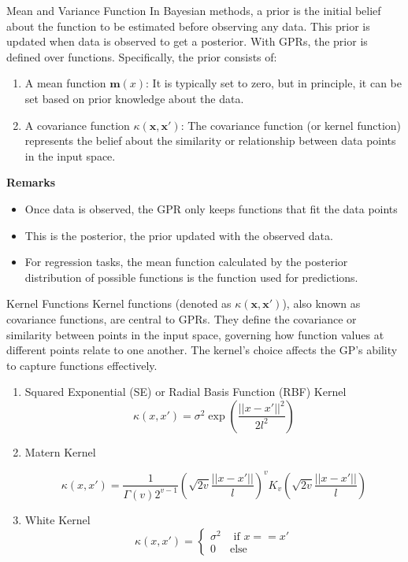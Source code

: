 \documentclass[10pt]{beamer}
\begin{document}
\begin{frame}[fragile]{Mean and Variance Function}
	In Bayesian methods, a prior is the initial belief about the function to be estimated before observing any data. This prior is updated when data is observed to get a posterior. With GPRs, the prior is defined over functions. Specifically, the prior consists of:
	
	\begin{enumerate}
		\item A mean function $\mathbf{m}(x)$: It is typically set to zero, but in principle, it can be set based on prior knowledge about the data.
		\item A covariance function $\kappa(\mathbf{x}, \mathbf{x}′)$: The covariance function (or kernel function) represents the belief about the similarity or relationship between data points in the input space.
	\end{enumerate}
	\textbf{Remarks}
	\begin{itemize}
		\item Once data is observed, the GPR only keeps functions that fit the data points
		\item This is the posterior, the prior updated with the observed data.
		\item For regression tasks, the mean function calculated by the posterior distribution of possible functions is the function used for predictions.
		
	\end{itemize}
	
\end{frame}

\begin{frame}[fragile]{Kernel Functions}  %
	Kernel functions (denoted as $\kappa(\mathbf{x}, \mathbf{x}′)$), also known as covariance functions, are central to GPRs.
	They define the covariance or similarity between points in the input space, governing how function values at different points relate to one another. The kernel's choice affects the GP's ability to capture functions effectively.
	\begin{enumerate}
		\item Squared Exponential (SE) or Radial Basis Function (RBF) Kernel
		$$ \kappa(x, x') = \sigma^2 \exp \left(\frac{||x - x'||^2}{2l^2}\right)$$
		\item  Matern Kernel
		
		$$ \kappa (x, x') =  \frac{1}{\Gamma (v) 2^{v-1}} \left(\sqrt{2v} \frac{||x -x'||}{l}\right)^v K_v \left(\sqrt{2v} \frac{||x -x'||}{l}\right)$$
		\item White Kernel 
		$$ \kappa (x, x') = \begin{cases}
			\sigma^2 & \text{ if } x==x' \\ 
			0 & \text{else}
		\end{cases}$$
	\end{enumerate}
\end{frame}
\end{document}
